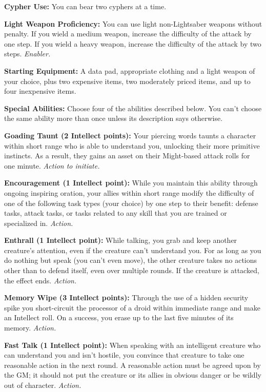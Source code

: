 \documentclass[a4paper,10pt,final,twocolumn,oneside]{book}
\newcommand{\itemLine}[2]{\textbf{#1:}{ #2}\par}
\newcommand{\itemAbility}[2]{\textcolor{25gray}{\textbullet\textbf{ #1:}}{ #2}\par}
\newcommand{\enabler}{\textit{ Enabler.}}
\newcommand{\action}{\textit{ Action.}}
\newcommand{\actionInit}{\textit{ Action to initiate.}}
\begin{document}
\itemLine{Cypher Use}{You can bear two cyphers at a time.}

\itemLine{Light Weapon Proficiency}{You can use light non-Lightsaber weapons without penalty. If you wield a medium weapon, increase the difficulty of the attack by one step. If you wield a heavy weapon, increase the difficulty of the attack by two steps.\enabler}

\itemLine{Starting Equipment}{A data pad, appropriate clothing and a light weapon of your choice, plus two expensive items, two moderately priced items, and up to four inexpensive items.}

\itemLine{Special Abilities}{Choose four of the abilities described below. You can’t choose the same ability more than once unless its description says otherwise.}

\itemAbility{Goading Taunt (2 Intellect points)}{Your piercing words taunts a character within short range who is able to understand you, unlocking their more primitive instincts. As a result, they gains an asset on their Might-based attack rolls for one minute.\actionInit}

\itemAbility{Encouragement (1 Intellect point)}{While you maintain this ability through ongoing inspiring oration, your allies within short range modify the difficulty of one of the following task types (your choice) by one step to their benefit: defense tasks, attack tasks, or tasks related to any skill that you are trained or specialized in.\action}

\itemAbility{Enthrall (1 Intellect point)}{While talking, you grab and keep another creature’s attention, even if the creature can’t understand you. For as long as you do nothing but speak (you can’t even move), the other creature takes no actions other than to defend itself, even over multiple rounds. If the creature is attacked, the effect ends.\action}

\itemAbility{Memory Wipe (3 Intellect points)}{Through the use of a hidden security spike you short-circuit the processor of a droid within immediate range and make an Intellect roll. On a success, you erase up to the last five minutes of its memory.\action}

\itemAbility{Fast Talk (1 Intellect point)}{When speaking with an intelligent creature who can understand you and isn’t hostile, you convince that creature to take one reasonable action in the next round. A reasonable action must be agreed upon by the GM; it should not put the creature or its allies in obvious danger or be wildly out of character.\action}
\end{document}
